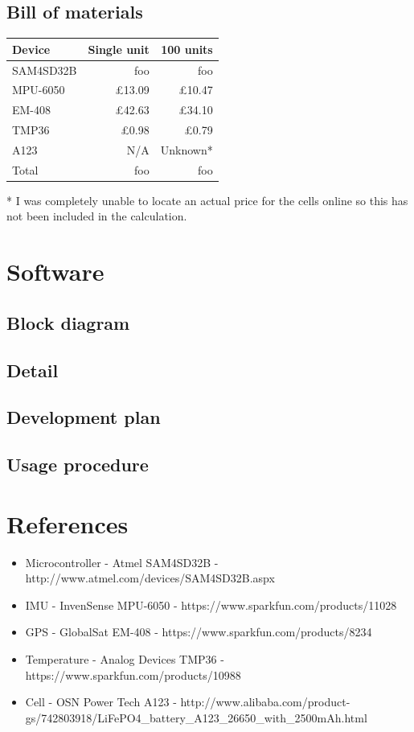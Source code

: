 \documentclass[a4paper, twoside]{article}
\begin{document}
\subsection{Bill of materials} %

\begin{tabular}{|l|r|r|}
	\hline
	\textbf{Device} & \textbf{Single unit} & \textbf{100 units} \\
	\hline
	\hline
	SAM4SD32B & foo & foo \\
	MPU-6050 & \pounds13.09 & \pounds10.47 \\
	EM-408 & \pounds42.63 & \pounds34.10 \\
	TMP36 & \pounds0.98 & \pounds0.79 \\
	A123 & N/A & Unknown* \\
	\hline
	\hline
	Total & foo & foo \\
	\hline
\end{tabular}

* I was completely unable to locate an actual price for the cells online so this
has not been included in the calculation. 

\section{Software}

\subsection{Block diagram}

\subsection{Detail} %

\subsection{Development plan}

\subsection{Usage procedure}

\section{References}
\begin{itemize}
	\item{Microcontroller - Atmel SAM4SD32B - http://www.atmel.com/devices/SAM4SD32B.aspx}
	\item{IMU - InvenSense MPU-6050 - https://www.sparkfun.com/products/11028}
	\item{GPS - GlobalSat EM-408 - https://www.sparkfun.com/products/8234}
	\item{Temperature - Analog Devices TMP36 - https://www.sparkfun.com/products/10988}
	\item{Cell - OSN Power Tech A123 -
		http://www.alibaba.com/product-gs/742803918/LiFePO4\_battery\_A123\_26650\_with\_2500mAh.html}
\end{itemize}
\end{document}
